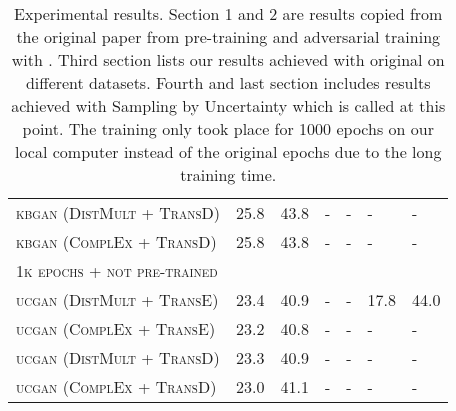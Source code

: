 \begin{table}[h]
\begin{tabular}{lllllll}
          \textsc{kbgan} (\textsc{DistMult} + \textsc{TransD})  & 25.8 & 43.8 & - & - & - & - \\

          \textsc{kbgan} (\textsc{ComplEx} + \textsc{TransD})  & 25.8 & 43.8 & - & - & - & - \\
          
          \midrule
         
         \textsc{1k epochs + not pre-trained} 
          &  &  &  &  &  & \\
          
          \textsc{ucgan} (\textsc{DistMult} + \textsc{TransE}) 
          & 23.4  & 40.9 & - & - & 17.8 & 44.0\\
         
         \textsc{ucgan} (\textsc{ComplEx} + \textsc{TransE}) 
          & 23.2  & 40.8 & - & - & - & - \\
          
          \textsc{ucgan} (\textsc{DistMult} + \textsc{TransD}) 
          & 23.3 & 40.9 & - & - & - & - \\
        
        \textsc{ucgan} (\textsc{ComplEx} + \textsc{TransD}) 
          & 23.0  & 41.1 & - & - & - & - \\
          
        \bottomrule
    \end{tabular}
    \caption{Experimental results.
    Section 1 and 2 are results copied from the original paper \cite{cai2017kbgan} from pre-training and adversarial training with \kbgan. 
    Third section lists our results achieved with original \kbgan on different datasets.
    Fourth and last section includes results achieved with Sampling by Uncertainty which is called \ucgan at this point.
    The training only took place for 1000 epochs on our local computer instead of the original  epochs due to the long training time.}
\label{tab:results}
\end{table}